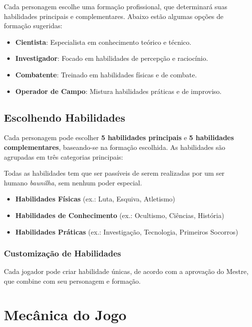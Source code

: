 \documentclass[a4paper,12pt]{book}
\begin{document}
Cada personagem escolhe uma formação profissional, que determinará suas habilidades principais e complementares. Abaixo estão algumas opções de formação sugeridas:

\begin{itemize}
    \item \textbf{Cientista}: Especialista em conhecimento teórico e técnico.
    \item \textbf{Investigador}: Focado em habilidades de percepção e raciocínio.
    \item \textbf{Combatente}: Treinado em habilidades físicas e de combate.
    \item \textbf{Operador de Campo}: Mistura habilidades práticas e de improviso.
\end{itemize}

\section{Escolhendo Habilidades}

Cada personagem pode escolher \textbf{5 habilidades principais} e \textbf{5 habilidades complementares}, baseando-se na formação escolhida. As habilidades são agrupadas em três categorias principais:

Todas as habilidades tem que ser passíveis de serem realizadas por um ser humano \textit{baunilha}, sem nenhum poder especial.

\begin{itemize}
    \item \textbf{Habilidades Físicas} (ex.: Luta, Esquiva, Atletismo)
    \item \textbf{Habilidades de Conhecimento} (ex.: Ocultismo, Ciências, História)
    \item \textbf{Habilidades Práticas} (ex.: Investigação, Tecnologia, Primeiros Socorros)
\end{itemize}

\subsection{Customização de Habilidades}

Cada jogador pode criar habilidade únicas, de acordo com a aprovação do Mestre, que combine com seu personagem e formação.

\chapter{Mecânica do Jogo}
\end{document}

